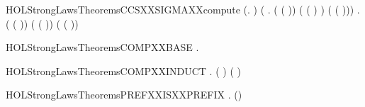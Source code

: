 \newcommand{\HOLStrongLawsTheoremsCCSXXCOMPXXcompute}{\UseVerbatim{HOLStrongLawsTheoremsCCSXXCOMPXXcompute}}
\begin{SaveVerbatim}{HOLStrongLawsTheoremsCCSXXSIGMAXXcompute}
\HOLTokenTurnstile{} (\HOLSymConst{\HOLTokenForall{}}.    \HOLSymConst{=}  ) \HOLSymConst{\HOLTokenConj{}}
   (\HOLSymConst{\HOLTokenForall{}} .
          ( ( )) \HOLSymConst{=}
          ( ( ) \HOLSymConst{\ensuremath{-}} ) \HOLSymConst{\ensuremath{+}}  ( ( ))) \HOLSymConst{\HOLTokenConj{}}
   \HOLSymConst{\HOLTokenForall{}} .
         ( ( )) \HOLSymConst{=}
         ( ( )) \HOLSymConst{\ensuremath{+}}  ( ( ))
\end{SaveVerbatim}
\newcommand{\HOLStrongLawsTheoremsCCSXXSIGMAXXcompute}{\UseVerbatim{HOLStrongLawsTheoremsCCSXXSIGMAXXcompute}}
\begin{SaveVerbatim}{HOLStrongLawsTheoremsCOMPXXBASE}
\HOLTokenTurnstile{} \HOLSymConst{\HOLTokenForall{}}.    \HOLSymConst{=}  
\end{SaveVerbatim}
\newcommand{\HOLStrongLawsTheoremsCOMPXXBASE}{\UseVerbatim{HOLStrongLawsTheoremsCOMPXXBASE}}
\begin{SaveVerbatim}{HOLStrongLawsTheoremsCOMPXXINDUCT}
\HOLTokenTurnstile{} \HOLSymConst{\HOLTokenForall{}} .   ( ) \HOLSymConst{=}    \HOLSymConst{\ensuremath{\parallel}}  ( )
\end{SaveVerbatim}
\newcommand{\HOLStrongLawsTheoremsCOMPXXINDUCT}{\UseVerbatim{HOLStrongLawsTheoremsCOMPXXINDUCT}}
\begin{SaveVerbatim}{HOLStrongLawsTheoremsPREFXXISXXPREFIX}
\HOLTokenTurnstile{} \HOLSymConst{\HOLTokenForall{}} .  ()
\end{SaveVerbatim}
